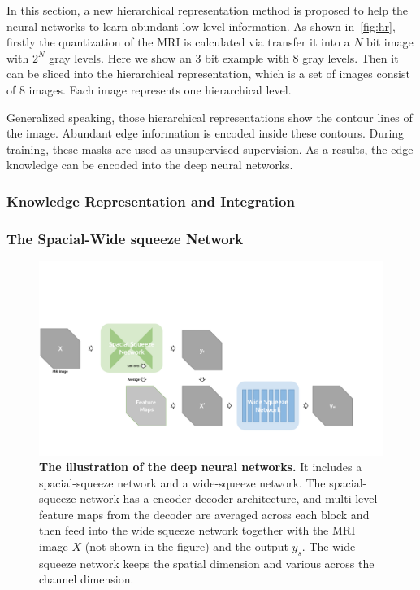 \documentclass[10pt,twocolumn,letterpaper]{article}
\begin{document}
In this section, a new hierarchical representation method is proposed to help the neural networks to learn abundant low-level information. 
As shown in~\cref{fig:hr}, firstly the quantization of the MRI is calculated via transfer it into a $N$ bit image with $2^N$ gray levels. 
Here we show an 3 bit example with 8 gray levels. 
Then it can be sliced into the hierarchical representation, which is a set of images consist of 8 images. Each image represents one hierarchical level. 

Generalized speaking, those hierarchical representations show the contour lines of the image. Abundant edge information is encoded inside these contours. 
During training, these masks are used as unsupervised supervision. 
As a results, the edge knowledge can be encoded into the deep neural networks. 



\subsubsection{Knowledge Representation and Integration}








\subsubsection{The Spacial-Wide squeeze Network}


\begin{figure}
  \centering
     \includegraphics[width=1\linewidth]{./figs/main.pdf}
    \caption{\textbf{The illustration of the deep neural networks. } It includes a spacial-squeeze network and a wide-squeeze network. The spacial-squeeze network has a encoder-decoder architecture, and multi-level feature maps from the decoder are averaged across each block and then feed into the wide squeeze network together with the MRI image $X$ (not shown in the figure) and the output $y_s$. The wide-squeeze network keeps the spatial dimension and various across the channel dimension. }
    \label{fig:main}
\end{figure}
\end{document}
